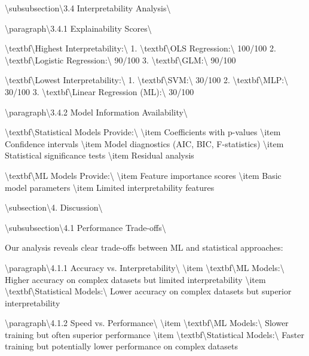 \documentclass[11pt,a4paper]{article}
\begin{document}
\textbackslash{}subsubsection\textbackslash{}{3.4 Interpretability Analysis\textbackslash{}}

\textbackslash{}paragraph\textbackslash{}{3.4.1 Explainability Scores\textbackslash{}}

\textbackslash{}textbf\textbackslash{}{Highest Interpretability:\textbackslash{}}
1. \textbackslash{}textbf\textbackslash{}{OLS Regression:\textbackslash{}} 100/100
2. \textbackslash{}textbf\textbackslash{}{Logistic Regression:\textbackslash{}} 90/100
3. \textbackslash{}textbf\textbackslash{}{GLM:\textbackslash{}} 90/100

\textbackslash{}textbf\textbackslash{}{Lowest Interpretability:\textbackslash{}}
1. \textbackslash{}textbf\textbackslash{}{SVM:\textbackslash{}} 30/100
2. \textbackslash{}textbf\textbackslash{}{MLP:\textbackslash{}} 30/100
3. \textbackslash{}textbf\textbackslash{}{Linear Regression (ML):\textbackslash{}} 30/100

\textbackslash{}paragraph\textbackslash{}{3.4.2 Model Information Availability\textbackslash{}}

\textbackslash{}textbf\textbackslash{}{Statistical Models Provide:\textbackslash{}}
\textbackslash{}item Coefficients with p-values
\textbackslash{}item Confidence intervals
\textbackslash{}item Model diagnostics (AIC, BIC, F-statistics)
\textbackslash{}item Statistical significance tests
\textbackslash{}item Residual analysis

\textbackslash{}textbf\textbackslash{}{ML Models Provide:\textbackslash{}}
\textbackslash{}item Feature importance scores
\textbackslash{}item Basic model parameters
\textbackslash{}item Limited interpretability features

\textbackslash{}subsection\textbackslash{}{4. Discussion\textbackslash{}}

\textbackslash{}subsubsection\textbackslash{}{4.1 Performance Trade-offs\textbackslash{}}

Our analysis reveals clear trade-offs between ML and statistical approaches:

\textbackslash{}paragraph\textbackslash{}{4.1.1 Accuracy vs. Interpretability\textbackslash{}}
\textbackslash{}item \textbackslash{}textbf\textbackslash{}{ML Models:\textbackslash{}} Higher accuracy on complex datasets but limited interpretability
\textbackslash{}item \textbackslash{}textbf\textbackslash{}{Statistical Models:\textbackslash{}} Lower accuracy on complex datasets but superior interpretability

\textbackslash{}paragraph\textbackslash{}{4.1.2 Speed vs. Performance\textbackslash{}}
\textbackslash{}item \textbackslash{}textbf\textbackslash{}{ML Models:\textbackslash{}} Slower training but often superior performance
\textbackslash{}item \textbackslash{}textbf\textbackslash{}{Statistical Models:\textbackslash{}} Faster training but potentially lower performance on complex datasets
\end{document}
